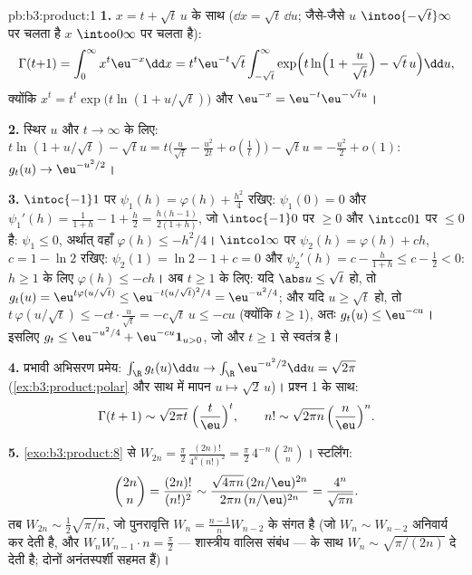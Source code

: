 \begin{solution}{pb:b3:product:1}
\textbf{1.} $x = t + \sqrt t\,u$ के साथ ($\dd x = \sqrt
t\,\dd u$; जैसे-जैसे $u$ $\intoo{-\sqrt t}\infty$ पर चलता है
$x$ $\intoo0\infty$ पर चलता है):
\[
\Gamma(t{+}1) = \int_0^\infty x^t\eu^{-x}\dd x
= t^t\eu^{-t}\sqrt t\int_{-\sqrt t}^{\infty}
\exp\Bigl(t\ln\Bigl(1 + \frac u{\sqrt t}\Bigr) - \sqrt
t\,u\Bigr)\dd u,
\]
क्योंकि $x^t = t^t\exp\bigl(t\ln(1 + u/\sqrt t)\bigr)$ और $\eu^{-x} = \eu^{-t}\eu^{-\sqrt tu}$।

\textbf{2.} स्थिर $u$ और $t \to \infty$ के लिए: $t\ln(1 +
u/\sqrt t) - \sqrt tu = t\bigl(\frac u{\sqrt t} -
\frac{u^2}{2t} + o(\frac1t)\bigr) - \sqrt tu = -\frac{u^2}2 +
o(1)$: $g_t(u) \to \eu^{-u^2/2}$।

\textbf{3.} $\intoc{-1}1$ पर $\psi_1(h) = \varphi(h) + \frac{h^2}4$ रखिए: $\psi_1(0) = 0$ और $\psi_1'(h) = \frac1{1+h} -
1 + \frac h2 = \frac{h(h-1)}{2(1+h)}$, जो $\intoc{-1}0$ पर $\geq 0$
और $\intcc01$ पर $\leq 0$ है: $\psi_1 \leq 0$, अर्थात् वहाँ $\varphi(h) \leq -h^2/4$। $\intco1\infty$ पर $\psi_2(h) =
\varphi(h) + ch$,
$c = 1 - \ln2$ रखिए: $\psi_2(1)
= \ln2 - 1 + c = 0$ और $\psi_2'(h) = c - \frac h{1+h} \leq c -
\frac12 < 0$: $h \geq 1$ के लिए $\varphi(h) \leq -ch$। अब $t
\geq 1$ के लिए:
यदि $\abs u \leq \sqrt t$ हो, तो $g_t(u) =
\eu^{t\varphi(u/\sqrt t)} \leq \eu^{-t(u/\sqrt t)^2/4} =
\eu^{-u^2/4}$; और यदि $u \geq \sqrt t$ हो, तो $t\,\varphi(u/\sqrt t) \leq
-ct\cdot\frac u{\sqrt t} = -c\sqrt t\,u \leq -cu$ (क्योंकि $t \geq
1$),
अतः $g_t(u) \leq \eu^{-cu}$। इसलिए $g_t \leq \eu^{-u^2/4} +
\eu^{-cu}\mathbf 1_{u>0}$, जो  और $t \geq
1$ से स्वतंत्र है।

\textbf{4.} प्रभावी अभिसरण प्रमेय: $\int_\R g_t(u)\dd u \to
\int_\R\eu^{-u^2/2}\dd u = \sqrt{2\pi}$ (\cref{ex:b3:product:polar} और साथ में मापन
$u\mapsto\sqrt2\,u$)। प्रश्न 1 के साथ:
\[
\Gamma(t + 1) \sim \sqrt{2\pi t}\;\Bigl(\frac
t\eu\Bigr)^t,\qquad
n! \sim \sqrt{2\pi n}\,\Bigl(\frac n\eu\Bigr)^n .
\]

\textbf{5.} \cref{exo:b3:product:8} से $W_{2n} =
\frac\pi2\,\frac{(2n)!}{4^n(n!)^2} =
\frac\pi2\,4^{-n}\binom{2n}n$। स्टर्लिंग:
\[
\binom{2n}{n} = \frac{(2n)!}{(n!)^2}
\sim \frac{\sqrt{4\pi n}\,(2n/\eu)^{2n}}
{2\pi n\,(n/\eu)^{2n}} = \frac{4^n}{\sqrt{\pi n}} .
\]
तब $W_{2n} \sim \frac12\sqrt{\pi/n}$, जो पुनरावृत्ति $W_n = \frac{n-1}nW_{n-2}$ के संगत है (जो $W_n \sim
W_{n-2}$ अनिवार्य कर देती
है, और $W_nW_{n-1}\cdot n = \frac\pi2$ --- शास्त्रीय वालिस संबंध --- के साथ $W_n \sim
\sqrt{\pi/(2n)}$ दे देती है;
दोनों अनंतस्पर्शी सहमत हैं)।


\end{solution}
